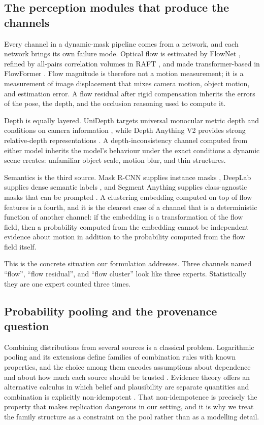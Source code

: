 \documentclass[10pt,conference]{IEEEtran}
\begin{document}
\subsection{The perception modules that produce the channels}
Every channel in a dynamic-mask pipeline comes from a network, and each network brings its own failure mode. Optical flow is estimated by FlowNet \cite{dosovitskiy2015flownet}, refined by all-pairs correlation volumes in RAFT \cite{teed2020raft}, and made transformer-based in FlowFormer \cite{huang2022flowformer}. Flow magnitude is therefore not a motion measurement; it is a measurement of image displacement that mixes camera motion, object motion, and estimation error. A flow residual after rigid compensation inherits the errors of the pose, the depth, and the occlusion reasoning used to compute it.

Depth is equally layered. UniDepth targets universal monocular metric depth and conditions on camera information \cite{piccinelli2024unidepth}, while Depth Anything V2 provides strong relative-depth representations \cite{yang2024depth}. A depth-inconsistency channel computed from either model inherits the model's behaviour under the exact conditions a dynamic scene creates: unfamiliar object scale, motion blur, and thin structures.

Semantics is the third source. Mask R-CNN supplies instance masks \cite{he2017maskrcnn}, DeepLab supplies dense semantic labels \cite{chen2018deeplab}, and Segment Anything supplies class-agnostic masks that can be prompted \cite{kirillov2023sam}. A clustering embedding computed on top of flow features is a fourth, and it is the clearest case of a channel that is a deterministic function of another channel: if the embedding is a transformation of the flow field, then a probability computed from the embedding cannot be independent evidence about motion in addition to the probability computed from the flow field itself.

This is the concrete situation our formulation addresses. Three channels named ``flow'', ``flow residual'', and ``flow cluster'' look like three experts. Statistically they are one expert counted three times.

\subsection{Probability pooling and the provenance question}
Combining distributions from several sources is a classical problem. Logarithmic pooling and its extensions define families of combination rules with known properties, and the choice among them encodes assumptions about dependence and about how much each source should be trusted \cite{decarvalho2023pool}. Evidence theory offers an alternative calculus in which belief and plausibility are separate quantities and combination is explicitly non-idempotent \cite{shafer1976evidence}. That non-idempotence is precisely the property that makes replication dangerous in our setting, and it is why we treat the family structure as a constraint on the pool rather than as a modelling detail.
\end{document}
